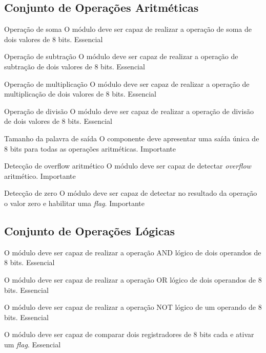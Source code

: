 \documentclass{article}
\begin{document}
  \subsection{Conjunto de Operações Aritméticas} 
  
    \begin{functional}
      \requirement
      {Operação de soma}
      {O módulo deve ser capaz de realizar a operação de soma de dois valores de 8 bits.}
      {Essencial}

      \requirement
      {Operação de subtração}
      {O módulo deve ser capaz de realizar a operação de subtração de dois valores de 8 bits.}
      {Essencial}

      \requirement
      {Operação de multiplicação}
      {O módulo deve ser capaz de realizar a operação de multiplicação de dois valores de 8 bits. }
      {Essencial}

      \requirement
      {Operação de divisão}
      {O módulo deve ser capaz de realizar a operação de divisão de dois valores de 8 bits.}
      {Essencial} 

      \requirement
      {Tamanho da palavra de saída}
      {O componente deve apresentar uma saída única de 8 bits para todas as operações aritméticas.}
      {Importante}       

      \requirement
      {Detecção de overflow aritmético}
      {O módulo deve ser capaz de detectar \textit{overflow} aritmético.}
      {Importante}
      
      \requirement
      {Detecção de zero}
      {O módulo deve ser capaz de detectar no resultado da operação o valor zero e habilitar uma \textit{flag}.}
      {Importante}
    \end{functional}

  \subsection{Conjunto de Operações Lógicas} 
  
    \begin{functional}
      {O módulo deve ser capaz de realizar a operação AND lógico de dois operandos de 8 bits.}
      {Essencial}

      {O módulo deve ser capaz de realizar a operação OR lógico de dois operandos de 8 bits.}
      {Essencial}  
      
      {O módulo deve ser capaz de realizar a operação NOT lógico de um operando de 8 bits.}
      {Essencial}   
      
      {O módulo deve ser capaz de comparar dois registradores de 8 bits cada e ativar um \textit{flag}.}
      {Essencial}
    \end{functional}  
    
\end{document}
